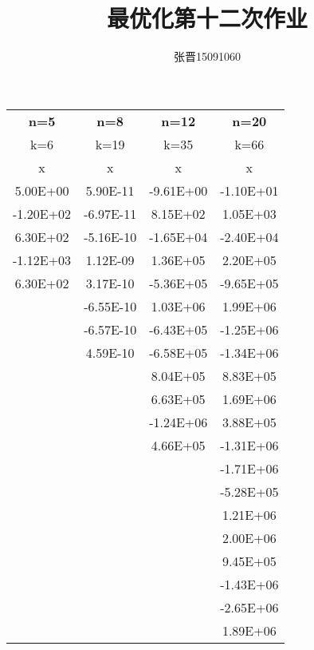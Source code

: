 \documentclass[UTF8]{ctexart}
\title{\heiti 最优化第十二次作业}
\author{\kaishu 张晋15091060}
\begin{document}
\maketitle

\begin{table}[htbp]
  \centering
    \begin{tabular}{cccc}
    \rowcolor{gray!50}
    \textbf{n=5} & \textbf{n=8} & \textbf{n=12} & \textbf{n=20} \\
    k=6   & k=19  & k=35  & k=66 \\
    x     & x     & x     & x \\
    5.00E+00 & 5.90E-11 & -9.61E+00 & -1.10E+01 \\
    -1.20E+02 & -6.97E-11 & 8.15E+02 & 1.05E+03 \\
    6.30E+02 & -5.16E-10 & -1.65E+04 & -2.40E+04 \\
    -1.12E+03 & 1.12E-09 & 1.36E+05 & 2.20E+05 \\
    6.30E+02 & 3.17E-10 & -5.36E+05 & -9.65E+05 \\
          & -6.55E-10 & 1.03E+06 & 1.99E+06 \\
          & -6.57E-10 & -6.43E+05 & -1.25E+06 \\
          & 4.59E-10 & -6.58E+05 & -1.34E+06 \\
          &       & 8.04E+05 & 8.83E+05 \\
          &       & 6.63E+05 & 1.69E+06 \\
          &       & -1.24E+06 & 3.88E+05 \\
          &       & 4.66E+05 & -1.31E+06 \\
          &       &       & -1.71E+06 \\
          &       &       & -5.28E+05 \\
          &       &       & 1.21E+06 \\
          &       &       & 2.00E+06 \\
          &       &       & 9.45E+05 \\
          &       &       & -1.43E+06 \\
          &       &       & -2.65E+06 \\
          &       &       & 1.89E+06 \\
    \end{tabular}%
  \label{tab:addlabel}%
\end{table}%
\end{document}
